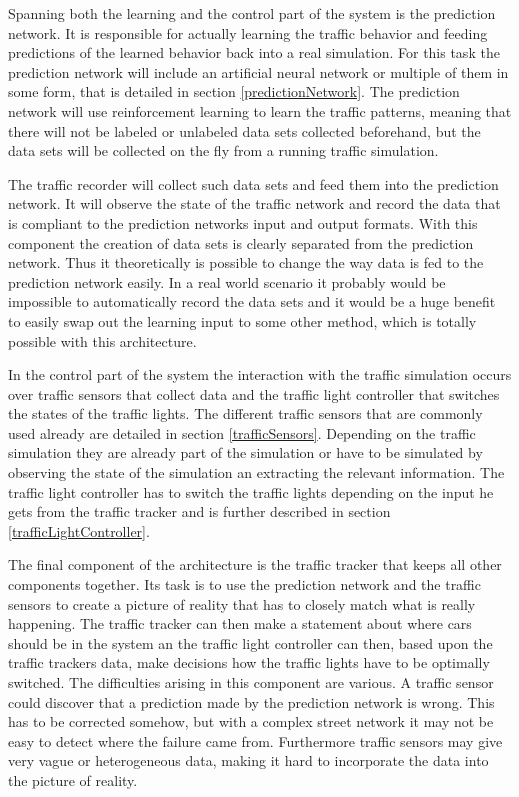 Spanning both the learning and the control part of the system is the prediction network. It is responsible for actually learning the traffic behavior and feeding predictions of the learned behavior back into a real simulation. For this task the prediction network will include an artificial neural network or multiple of them in some form, that is detailed in section \ref{predictionNetwork}. The prediction network will use reinforcement learning to learn the traffic patterns, meaning that there will not be labeled or unlabeled data sets collected beforehand, but the data sets will be collected on the fly from a running traffic simulation.

The traffic recorder will collect such data sets and feed them into the prediction network. It will observe the state of the traffic network and record the data that is compliant to the prediction networks input and output formats. With this component the creation of data sets is clearly separated from the prediction network. Thus it theoretically is possible to change the way data is fed to the prediction network easily. In a real world scenario it probably would be impossible to automatically record the data sets and it would be a huge benefit to easily swap out the learning input to some other method, which is totally possible with this architecture.

In the control part of the system the interaction with the traffic simulation occurs over traffic sensors that collect data and the traffic light controller that switches the states of the traffic lights. The different traffic sensors that are commonly used already are detailed in section \ref{trafficSensors}. Depending on the traffic simulation they are already part of the simulation or have to be simulated by observing the state of the simulation an extracting the relevant information. The traffic light controller has to switch the traffic lights depending on the input he gets from the traffic tracker and is further described in section \ref{trafficLightController}.

The final component of the architecture is the traffic tracker that keeps all other components together. Its task is to use the prediction network and the traffic sensors to create a picture of reality that has to closely match what is really happening. The traffic tracker can then make a statement about where cars should be in the system an the traffic light controller can then, based upon the traffic trackers data, make decisions how the traffic lights have to be optimally switched. The difficulties arising in this component are various. A traffic sensor could discover that a  prediction made by the prediction network is wrong. This has to be corrected somehow, but with a complex street network it may not be easy to detect where the failure came from. Furthermore traffic sensors may give very vague or heterogeneous data, making it hard to incorporate the data into the picture of reality.

